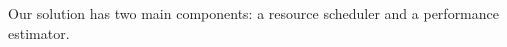 
 Our solution {\name} has two main components: a resource scheduler and a performance estimator. 

